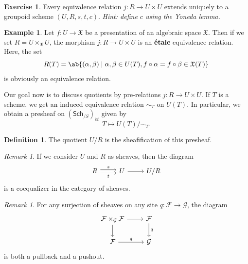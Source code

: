 \documentclass{amsart}
\theoremstyle{definition}
\newtheorem{defn}[thm]{Definition}
\newtheorem{exm}[thm]{Example}
\newtheorem{exer}[thm]{Exercise}
\theoremstyle{remark}
\newtheorem{rmk}[thm]{Remark}
\theoremstyle{plain}
\theoremstyle{definition}
\theoremstyle{remark}
\newcommand{\mc}[1]{\mathcal{#1}}
\newcommand{\mf}[1]{\mathfrak{#1}}
\newcommand{\ms}[1]{\mathsf{#1}}
\newcommand{\1}{\mathbf{1}}
\newcommand{\2}{\mathbf{2}}
\newcommand{\3}{\mathbf{3}}
\begin{document}
\begin{exer}
    Every equivalence relation \(j \colon R \to U \times U\) extends uniquely to a groupoid scheme \((U, R, s, t, c)\). \textit{Hint: define \(c\) using the Yoneda lemma.}
\end{exer}

\begin{exm}
    Let \(f \colon U \to \mf{X}\) be a presentation of an algebraic space \(\mf{X}\). Then if we set \(R = U \times_{\mf{X}} U\), the morphism \(j \colon R \to U \times U\) is an \textbf{\'etale} equivalence relation. Here, the set
    \[ R(T) = \ab\{ (\alpha, \beta) \mid \alpha, \beta \in U(T), f \circ \alpha = f \circ \beta \in \mf{X}(T) \} \]
    is obviously an equivalence relation.
\end{exm}

Our goal now is to discuss quotients by pre-relations \(j \colon R \to U \times U\). If \(T\) is a scheme, we get an induced equivalence relation \(\sim_T\) on \(U(T)\). In particular, we obtain a presheaf on \((\ms{Sch}_{/S})_{\acute{e}t}\) given by
\[ T \mapsto U(T) /\sim_T. \]

\begin{defn}
    The quotient \(U/R\) is the sheafification of this presheaf.
\end{defn}

\begin{rmk}
    If we consider \(U\) and \(R\) as sheaves, then the diagram
    \begin{equation*}
    \begin{tikzcd}
        R \ar[shift left=1]{r}{s} \ar[shift right=1]{r}[swap]{t} & U \ar{r} & U/R
    \end{tikzcd}
    \end{equation*}
    is a coequalizer in the category of sheaves.
\end{rmk}

\begin{rmk}
    For any surjection of sheaves on any site \(q \colon \mc{F} \to \mc{G}\), the diagram
    \begin{equation*}
    \begin{tikzcd}
        \mc{F} \times_{\mc{G}} \mc{F} \ar{d} \ar{r} & \mc{F} \ar{d}{q} \\
        \mc{F} \ar{r}{q} & \mc{G}
    \end{tikzcd}
    \end{equation*}
    is both a pullback and a pushout.
\end{rmk}
\end{document}
